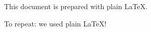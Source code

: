 \documentclass{article}
\newcommand{\pythononly}[1]{} %
\newcommand{\latexonly}[1]{#1}
\begin{document}
\pythononly
{%
: This document is prepared with \emph{latex.py}.
}%

\latexonly%
{
This document is prepared with plain \LaTeX.
}

\newcommand{\textprocessor}{plain \LaTeX}
To repeat: we used \textprocessor!
\end{document}
